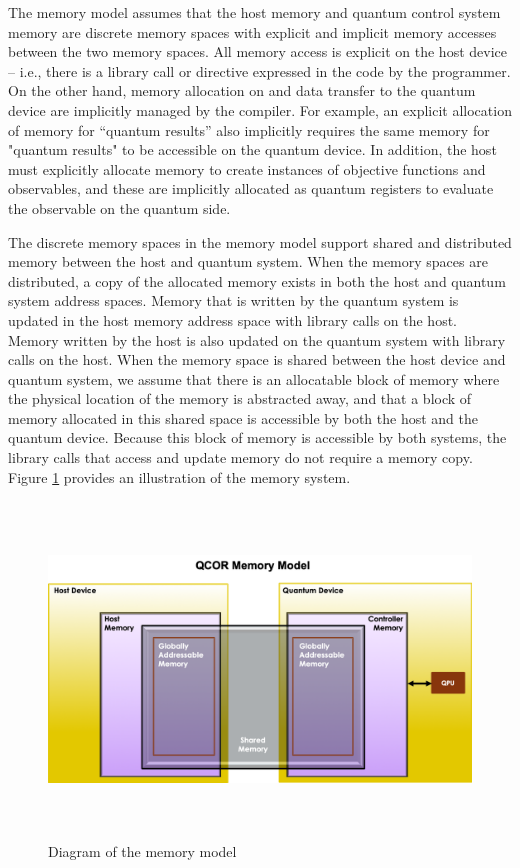 The \qcor memory model assumes that the host memory and quantum control system memory are discrete memory spaces with explicit and implicit memory accesses between the two memory spaces.  
All memory access is explicit on the host device -- i.e., there is a library call or directive expressed in the code by the programmer. On the other hand, memory allocation on and data transfer to the quantum device are implicitly managed by the compiler. For example, an explicit allocation of memory for ``quantum results'' also implicitly requires the same memory for "quantum results" to be accessible on the quantum device. In addition, the host must explicitly allocate memory to create instances of objective functions and observables, and these are implicitly allocated as quantum registers to evaluate the observable on the quantum side. 

The discrete memory spaces in the \qcor memory model support shared and distributed memory between the host and quantum system. 
When the memory spaces are distributed, a copy of the allocated memory exists in both the host and quantum system address spaces.  
Memory that is written by the quantum system is updated in the host memory address space with library calls on the host. 
Memory written by the host is also updated on the quantum system with library calls on the host.  
When the memory space is shared between the host device and quantum system, we assume that there is an allocatable block of memory where the physical location of the memory is abstracted away, and that a block of memory allocated in this shared space is accessible by both the host and the quantum device. Because this block of memory is accessible by both systems, the library calls that access and update memory do not require a memory copy. Figure \ref{fig:mem_model} provides an illustration of the memory system.

\begin{figure}[ht]
 \centering
  \includegraphics[height=3.5in,width=5.5in]{figures/Memory_Model_Illustration_v4.png}
  \caption{Diagram of the \qcor memory model}
  \label{fig:mem_model}
\end{figure}
